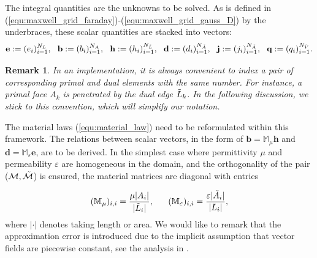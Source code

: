 \documentclass{article}
\newtheorem*{remark}{Remark}
\begin{document}
The integral quantities are the unknowns to be solved. As is defined in (\ref{equ:maxwell_grid_faraday})-(\ref{equ:maxwell_grid_gauss_D}) by the underbraces, these scalar quantities are stacked into vectors:
\begin{equation} \label{equ:fit_scale_vector}
    \mathbf{e} := (e_i)_{i=1}^{N_L},\ \ \mathbf{b} := (b_i)_{i=1}^{N_A}, \ \ \mathbf{h} := (h_i)_{i=1}^{N_{\Tilde{L}}}, \ \ \mathbf{d} := (d_i)_{i=1}^{N_{\Tilde{A}}}, \ \ \mathbf{j} := (j_i)_{i=1}^{N_{\Tilde{A}}}, \ \ \mathbf{q} := (q_i)_{i=1}^{N_{\Tilde{V}}}.
\end{equation}

\begin{remark}
    In an implementation, it is always convenient to index a pair of corresponding primal and dual elements with the same number. For instance, a primal face $A_k$ is penetrated by the dual edge $\Tilde{L}_k$. In the following discussion, we stick to this convention, which will simplify our notation.
\end{remark}

The material laws (\ref{equ:material_law}) need to be reformulated within this framework. The relations between scalar vectors, in the form of $\mathbf{b} = \mathbb{M}_\mu \mathbf{h}$ and $\mathbf{d} = \mathbb{M}_\varepsilon \mathbf{e}$, are to be derived. In the simplest case where permittivity $\mu$ and permeability $\varepsilon$ are homogeneous in the domain, and the orthogonality of the pair ($\mathcal{M}, \Tilde{\mathcal{M}}$) is ensured, the material matrices are diagonal with entries 

\begin{equation*}
    (\mathbb{M}_\mu)_{i,i} = \frac{\mu|A_i|}{|\Tilde{L}_i|}, \ \ \ \ \ (\mathbb{M}_\varepsilon)_{i,i} = \frac{\varepsilon |\Tilde{A}_i|}{|L_i|},
\end{equation*}
where $|\cdot|$ denotes taking length or area. We would like to remark that the approximation error is introduced due to the implicit assumption that vector fields are piecewise constant, see the analysis in \cite{Marrone_2001}.
\end{document}
